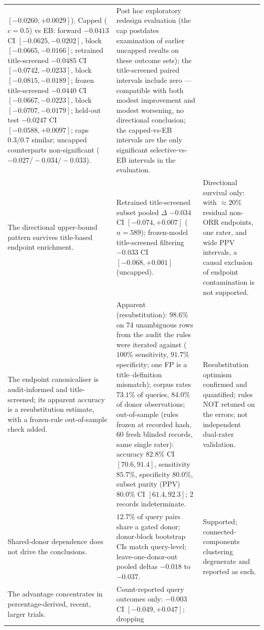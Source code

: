 \documentclass[11pt]{article}
\begin{document}
\begin{longtable}{p{} p{} p{}}
$[-0.0260,+0.0029]$). Capped
($c=0.5$) vs EB: forward $-0.0413$ CI $[-0.0625,-0.0202]$, block
$[-0.0665,-0.0166]$; retrained
title-screened $-0.0485$ CI $[-0.0742,-0.0233]$, block
$[-0.0815,-0.0189]$; frozen title-screened
$-0.0440$ CI $[-0.0667,-0.0223]$, block $[-0.0707,-0.0179]$; held-out
test $-0.0247$ CI
$[-0.0588,+0.0097]$; caps $0.3/0.7$ similar; uncapped counterparts
non-significant ($-0.027/-0.034/-0.033$). & Post hoc exploratory redesign
evaluation (the cap postdates examination of earlier uncapped results on
these outcome sets); the title-screened paired intervals include zero
--- compatible with both modest improvement and modest worsening, no
directional conclusion; the capped-vs-EB
intervals are the only significant selective-vs-EB intervals in
the evaluation. \\
The directional upper-bound pattern survives title-based endpoint
enrichment. &
Retrained title-screened subset pooled $\Delta$ $-0.034$ CI
$[-0.074,+0.007]$ ($n=589$); frozen-model title-screened filtering
$-0.033$ CI $[-0.068,+0.001]$ (uncapped). & Directional survival only:
with $\approx 20\%$ residual non-ORR endpoints, one rater, and wide PPV
intervals, a causal exclusion of endpoint contamination is not
supported. \\
The endpoint canonicaliser is audit-informed and title-screened; its
apparent accuracy is a resubstitution estimate, with a frozen-rule
out-of-sample check added. & Apparent (resubstitution): $98.6\%$ on 74
unambiguous rows from the audit the rules were iterated against ($100\%$
sensitivity, $91.7\%$ specificity; one FP is a title--definition
mismatch); corpus rates $73.1\%$ of queries, $84.0\%$ of donor
observations; out-of-sample (rules frozen at recorded hash, 60 fresh
blinded records, same single rater): accuracy $82.8\%$ CI $[70.6,91.4]$,
sensitivity $85.7\%$, specificity $80.0\%$, subset purity (PPV) $80.0\%$
CI $[61.4,92.3]$; 2 records indeterminate. & Resubstitution optimism
confirmed and quantified; rules NOT retuned on the errors; not
independent dual-rater validation. \\
Shared-donor dependence does not drive the conclusions. & $12.7\%$ of query
pairs share a gated donor; donor-block bootstrap CIs match query-level;
leave-one-donor-out pooled deltas $-0.018$ to $-0.037$. & Supported;
connected-components clustering degenerate and reported as such. \\
The advantage concentrates in percentage-derived, recent, larger trials. &
Count-reported query outcomes only: $-0.003$ CI $[-0.049,+0.047]$; dropping

\end{longtable}
\end{document}
